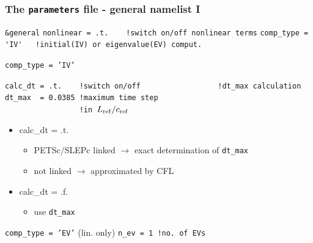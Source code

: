 \documentclass[10pt]{beamer}
\begin{document}
\begin{frame}[fragile]
  \frametitle{The {\tt parameters} file - general namelist I}

\begin{block}%

\begin{block}

\verb|&general|
\verb|nonlinear = .t.    !switch on/off nonlinear terms|
\verb|comp_type = 'IV'   !initial(IV) or eigenvalue(EV) comput.|
\end{block}
\begin{minipage}[t]{0.575\textwidth}
\small
 \begin{block}{{\tt comp\_type = 'IV'}}

\verb|calc_dt = .t.    !switch on/off| 
\verb|                 !dt_max calculation|
\verb|dt_max  = 0.0385 !maximum time step |\\
\verb|                 !in |$L_{\rm ref}/c_{\rm ref}$
\end{block}
\begin{itemize}
\item calc\_dt = .t.
\begin{itemize}
\item PETSc/SLEPc linked $\rightarrow$ exact determination of {\tt dt\_max}
\item not linked $\rightarrow$ approximated by CFL
\end{itemize}
\item calc\_dt = .f.
\begin{itemize}
\item use {\tt dt\_max}
\end{itemize}
\end{itemize}

\end{minipage}
\hspace{0.02\textwidth}
\begin{minipage}[t]{0.385\textwidth}
 \begin{block}{{\tt comp\_type = 'EV'} (lin. only)}
\verb|n_ev = 1 !no. of EVs|
 \end{block} 
\end{minipage}
\end{block}
\end{frame}

\end{document}
